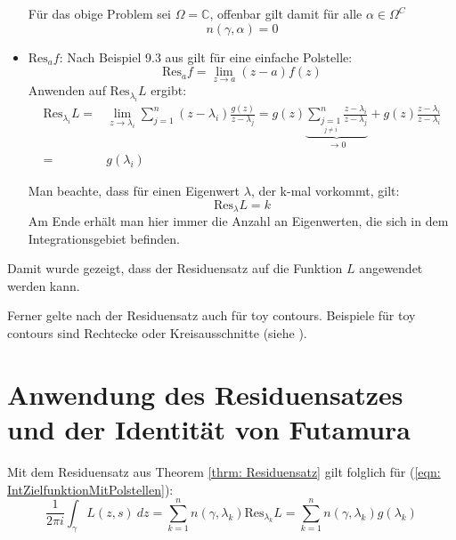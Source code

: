 \documentclass[a4paper,12pt]{report}
\newcommand{\C}{\mathbb C}
\newcommand{\zitat}[1]{\glqq #1\grqq}
\newcommand{\1}{\mathds{1}}
\newcommand{\Res}{\text{Res}}
\theoremstyle{plain} %
\theoremstyle{definition} %
\theoremstyle{remark}
\begin{document}
\begin{itemize}
                        Für das obige Problem sei $\Omega = \C$, offenbar gilt damit für alle $\alpha \in \Omega^C$
                        $$n(\gamma, \alpha) = 0$$

                  \item $\Res_af$:
                        Nach Beispiel 9.3 aus \cite[S. 142]{complexAnalysis} gilt für eine einfache Polstelle:
                        \begin{equation}
                              \label{hilfe: complexAnalysis_Residuum}
                              \Res_af = \lim_{z\to a} (z-a)f(z)
                        \end{equation}
                        Anwenden auf $\Res_{\lambda_i}L$ ergibt:
                        \begin{align*}
                              \Res_{\lambda_i}L =& \lim_{z\to \lambda_i} \sum_{j=1}^{n} (z-\lambda_i)\frac{g(z)}{z-\lambda_j} = g(z)\underbrace{\sum_{\underset{j\ne i}{j=1}}^{n} \frac{z-\lambda_i}{z-\lambda_j}}_{\to 0} + g(z)\frac{z-\lambda_i}{z-\lambda_i} \\
                              =& g(\lambda_i)
                        \end{align*}

                        Man beachte, dass für einen Eigenwert $\lambda$, der k-mal vorkommt, gilt:
                        $$\Res_\lambda L = k$$
                        Am Ende erhält man hier immer die Anzahl an Eigenwerten, die sich in dem Integrationsgebiet befinden.
            \end{itemize}

            Damit wurde gezeigt, dass der Residuensatz auf die Funktion $L$ angewendet werden kann.

            Ferner gelte nach \cite[S. 77]{complexAnalysisVL} der Residuensatz auch für \zitat{toy contours}\cite[S. 77]{complexAnalysisVL}.
            Beispiele für toy contours sind Rechtecke oder Kreisausschnitte (siehe \cite[S. 42]{complexAnalysisVL}).

      \section{Anwendung des Residuensatzes und der Identität von Futamura}
            Mit dem Residuensatz aus Theorem \ref{thrm: Residuensatz} gilt folglich für (\ref{eqn: IntZielfunktionMitPolstellen}):
            $$\frac 1 {2\pi i}\int_\gamma L(z,s)\ dz = \sum_{k=1}^{n} n(\gamma, \lambda_k) \Res_{\lambda_k}L = \sum_{k=1}^{n} n(\gamma, \lambda_k) g(\lambda_k)$$
\end{document}

